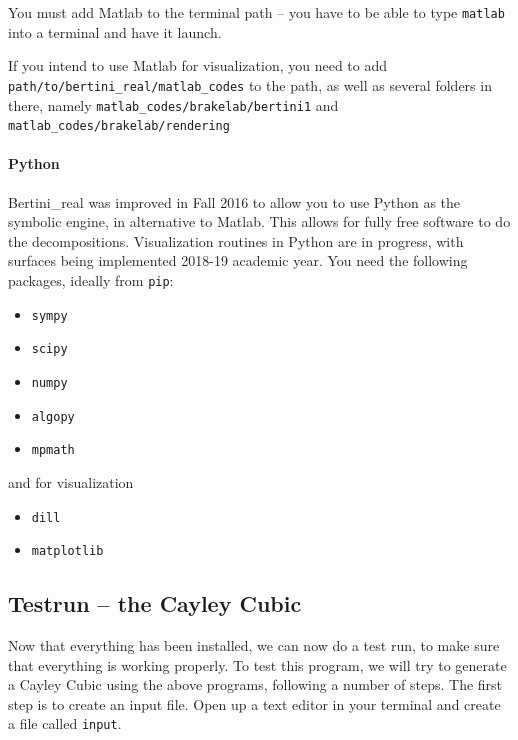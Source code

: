 You must add Matlab to the terminal path -- you have to be able to type {\tt matlab} into a terminal and have it launch.  

If you intend to use Matlab for visualization, you need to add {\tt path/to/bertini\_real/matlab\_codes} to the path, as well as several folders in there, namely {\tt matlab\_codes/brakelab/bertini1} and {\tt matlab\_codes/brakelab/rendering}

\paragraph*{Python}

Bertini\_real was improved in Fall 2016 to allow you to use Python as the symbolic engine, in alternative to Matlab.  This allows for fully free software to do the decompositions.  Visualization routines in Python are in progress, with surfaces being implemented 2018-19 academic year.  You need the following packages, ideally from {\tt pip}:
\begin{itemize}[noitemsep]
\item {\tt sympy}
\item {\tt scipy}
\item {\tt numpy}
\item {\tt algopy}
\item {\tt mpmath}
  \end{itemize}
and for visualization
\begin{itemize}[noitemsep]
\item {\tt dill}
\item {\tt matplotlib}
  \end{itemize}






\clearpage


\clearpage


\clearpage















\clearpage

\subsection{Testrun -- the Cayley Cubic}

Now that everything has been installed, we can now do a test run, to make sure that everything is working properly. To test this program, we will try to generate a Cayley Cubic using the above programs, following a number of steps. The first step is to create an input file. Open up a text editor in your terminal and create a file called \texttt{input}. 

